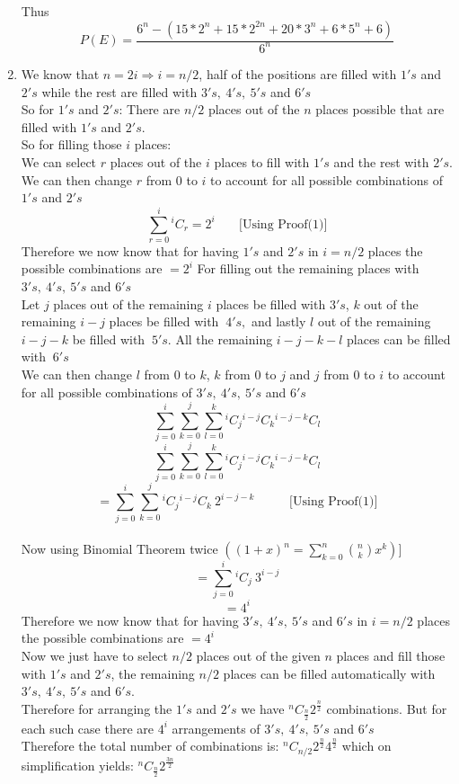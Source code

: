 \documentclass[10pt]{article}
\newcommand*{\Co}[2]{{}^{#1}C_{#2}}%
\newenvironment{solution}[2][Solution]{ \begin{trivlist}
\item[\hskip \labelsep {\bfseries #1}]}{\end{trivlist}}
\begin{document}
\begin{solution}{1}
\begin{enumerate}[label=(\alph*)]
    Thus $$P(E) = \frac{6^n - {(15*2^n + 15*2^{2n} + 20*3^n + 6*5^n + 6)}}{6^n}$$
    \item We know that $n=2i \Rightarrow i = n/2$, half of the positions are filled with $1's$ and $2's$ while the rest are filled with $3's,\ 4's,\ 5's$ and $6's$\\
    So for $1's$ and $2's$: There are $n/2$ places out of the $n$ places possible that are filled with $1's$ and $2's$.\\
    So for filling those $i$ places:\\
    We can select $r$ places out of the $i$ places to fill with $1's$ and the rest with $2's$. We can then change $r$ from $0$ to $i$ to account for all possible combinations of $1's$ and $2's$\\
    $$\sum_{r=0}^{i} \Co{i}{r} = 2^i\ \ \ \ \ \ \  \text{           [Using Proof(1)]}$$
    Therefore we now know that for having $1's$ and $2's$ in $i=n/2$ places the possible combinations are $=2^{i}$
    For filling out the remaining places with $3's,\ 4's,\ 5's$ and $6's$\\
    Let $j$ places out of the remaining $i$ places be filled with $3's$, $k$ out of the remaining $i-j$ places be filled with $\ 4's,$ and lastly $l$ out of the remaining $i-j-k$ be filled with $\ 5's$. All the remaining $i-j-k-l$ places can be filled with $\ 6's$\\
    We can then change $l$ from $0$ to $k$, $k$ from $0$ to $j$ and $j$ from $0$ to $i$ to account for all possible combinations of $3's,\ 4's,\ 5's$ and $6's$\\
    $$\sum_{j=0}^{i} \sum_{k=0}^{j} \sum_{l=0}^{k} \Co{i}{j}  \Co{i-j}{k} \Co{i-j-k}{l}$$
    $$\sum_{j=0}^{i} \sum_{k=0}^{j} \sum_{l=0}^{k} \Co{i}{j}  \Co{i-j}{k} \Co{i-j-k}{l}$$
    $$= \sum_{j=0}^{i} \sum_{k=0}^{j} \Co{i}{j}  \Co{i-j}{k}\ 2^{i-j-k}\ \ \ \ \ \ \ \ \ \ \  \text{                   [Using Proof(1)]}$$\\
    Now using Binomial Theorem twice $( (1+x)^n = \sum_{k=0}^n {n \choose k}  x^k ) ]$
    $$= \sum_{j=0}^{i} \Co{i}{j}\ 3^{i-j}$$
    $$=4^{i}$$
    Therefore we now know that for having $3's,\ 4's,\ 5's$ and $6's$ in $i=n/2$ places the possible combinations are $=4^{i}$  \\
    Now we just have to select $n/2$ places out of the given $n$ places and fill those with $1's$ and $2's$, the remaining $n/2$ places can be filled automatically with $3's,\ 4's,\ 5's$ and $6's$.\\
    Therefore for arranging the $1's$ and $2's$ we have $\Co{n}{\frac{n}{2}} 2^{\frac{n}{2}}$ combinations. But for each such case there are $4^i$ arrangements of $3's,\ 4's,\ 5's$ and $6's$\\
    Therefore the total number of combinations is: $\Co{n}{n/2} 2^{\frac{n}{2}} 4^{\frac{n}{2}}$ which on simplification yields: $\Co{n}{\frac{n}{2}} 2^{\frac{3n}{2}}$


\end{enumerate}
\end{solution}
\end{document}
